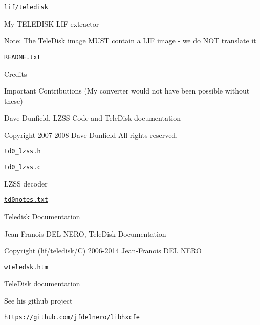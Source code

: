 \begin{DoxyItemize}
\item \href{lif/teledisk}{\tt lif/teledisk}
\begin{DoxyItemize}
\item My T\+E\+L\+E\+D\+I\+SK L\+IF extractor
\begin{DoxyItemize}
\item Note\+: The Tele\+Disk image M\+U\+ST contain a L\+IF image -\/ we do N\+OT translate it
\end{DoxyItemize}
\item \href{lif/teledisk/README.txt}{\tt R\+E\+A\+D\+M\+E.\+txt}
\begin{DoxyItemize}
\item Credits
\end{DoxyItemize}
\item Important Contributions (My converter would not have been possible without these)
\begin{DoxyItemize}
\item Dave Dunfield, L\+Z\+SS Code and Tele\+Disk documentation
\begin{DoxyItemize}
\item Copyright 2007-\/2008 Dave Dunfield All rights reserved.
\item \href{lif/teledisk/td0_lzss.h}{\tt td0\+\_\+lzss.\+h}
\item \href{lif/teledisk/td0_lzss.c}{\tt td0\+\_\+lzss.\+c}
\begin{DoxyItemize}
\item L\+Z\+SS decoder
\end{DoxyItemize}
\item \href{lif/teledisk/td0notes.txt}{\tt td0notes.\+txt}
\begin{DoxyItemize}
\item Teledisk Documentation
\end{DoxyItemize}
\end{DoxyItemize}
\item Jean-\/\+Franois D\+EL N\+E\+RO, Tele\+Disk Documentation
\begin{DoxyItemize}
\item Copyright (lif/teledisk/C) 2006-\/2014 Jean-\/\+Franois D\+EL N\+E\+RO
\begin{DoxyItemize}
\item \href{lif/teledisk/wteledsk.htm}{\tt wteledsk.\+htm}
\begin{DoxyItemize}
\item Tele\+Disk documentation
\end{DoxyItemize}
\item See his github project
\begin{DoxyItemize}
\item \href{https://github.com/jfdelnero/libhxcfe}{\tt https\+://github.\+com/jfdelnero/libhxcfe}
\end{DoxyItemize}
\end{DoxyItemize}
\end{DoxyItemize}
\end{DoxyItemize}
\end{DoxyItemize}
\end{DoxyItemize}


